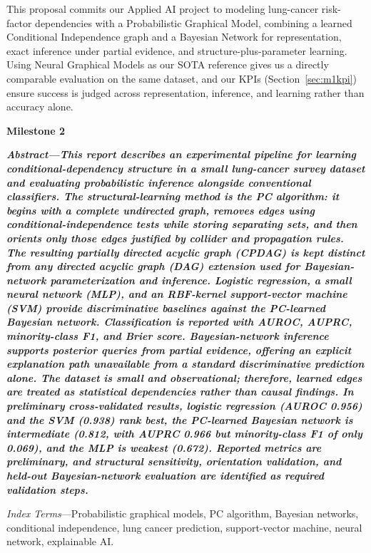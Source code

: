 \documentclass[10pt,twocolumn,letterpaper]{article}
\makeatletter
\renewcommand\section{\@startsection{section}{1}{\z@}{1.5ex plus 0.5ex minus 0.2ex}{1ex plus 0.2ex}{\centering\normalfont\footnotesize\scshape}}
\newcommand{\startms}{\setcounter{section}{0}\setcounter{table}{0}\setcounter{figure}{0}\setcounter{equation}{0}}
\newcommand{\msheader}[3]{\par\vspace{6pt}\begin{center}{\large\bfseries #1}\end{center}\vspace{-2pt}
{\small\bfseries\itshape\noindent\textit{Abstract}---#2\par\vspace{2pt}\noindent\textit{Index Terms}---#3\par}\vspace{2pt}\startms}
\makeatother
\begin{document}
\section{Conclusion}
This proposal commits our Applied AI project to modeling lung-cancer risk-factor dependencies with a Probabilistic Graphical Model, combining a learned Conditional Independence graph and a Bayesian Network for representation, exact inference under partial evidence, and structure-plus-parameter learning. Using Neural Graphical Models \cite{ngm} as our SOTA reference gives us a directly comparable evaluation on the same dataset, and our KPIs (Section~\ref{sec:m1kpi}) ensure success is judged across representation, inference, and learning rather than accuracy alone.

\msheader{Milestone 2}%
{This report describes an experimental pipeline for learning conditional-dependency structure in a small lung-cancer survey dataset and evaluating probabilistic inference alongside conventional classifiers. The structural-learning method is the PC algorithm: it begins with a complete undirected graph, removes edges using conditional-independence tests while storing separating sets, and then orients only those edges justified by collider and propagation rules. The resulting partially directed acyclic graph (CPDAG) is kept distinct from any directed acyclic graph (DAG) extension used for Bayesian-network parameterization and inference. Logistic regression, a small neural network (MLP), and an RBF-kernel support-vector machine (SVM) provide discriminative baselines against the PC-learned Bayesian network. Classification is reported with AUROC, AUPRC, minority-class F1, and Brier score. Bayesian-network inference supports posterior queries from partial evidence, offering an explicit explanation path unavailable from a standard discriminative prediction alone. The dataset is small and observational; therefore, learned edges are treated as statistical dependencies rather than causal findings. In preliminary cross-validated results, logistic regression (AUROC 0.956) and the SVM (0.938) rank best, the PC-learned Bayesian network is intermediate (0.812, with AUPRC 0.966 but minority-class F1 of only 0.069), and the MLP is weakest (0.672). Reported metrics are preliminary, and structural sensitivity, orientation validation, and held-out Bayesian-network evaluation are identified as required validation steps.}%
{Probabilistic graphical models, PC algorithm, Bayesian networks, conditional independence, lung cancer prediction, support-vector machine, neural network, explainable AI.}
\label{ms2}
\end{document}
